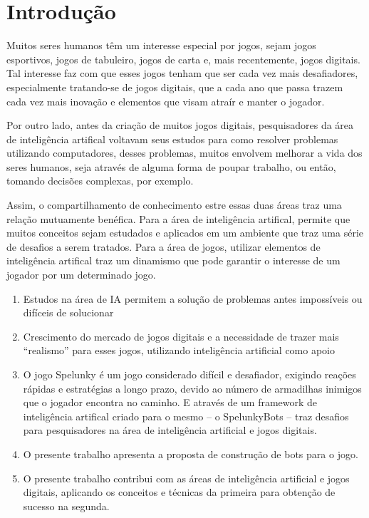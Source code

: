 \chapter{\label{chap:intro}Introdução}

Muitos seres humanos têm um interesse especial por jogos, sejam jogos
esportivos, jogos de tabuleiro, jogos de carta e, mais recentemente, jogos
digitais. Tal interesse faz com que esses jogos tenham que ser cada vez mais
desafiadores, especialmente tratando-se de jogos digitais, que a cada ano que
passa trazem cada vez mais inovação e elementos que visam atraír e manter o
jogador.

Por outro lado, antes da criação de muitos jogos digitais, pesquisadores da área
de inteligência artifical voltavam seus estudos para como resolver problemas
utilizando computadores, desses problemas, muitos envolvem melhorar a vida dos
seres humanos, seja através de alguma forma de poupar trabalho, ou então,
tomando decisões complexas, por exemplo.

Assim, o compartilhamento de conhecimento estre essas duas áreas traz uma
relação mutuamente benéfica. Para a área de inteligência artifical, permite que
muitos conceitos sejam estudados e aplicados em um ambiente que traz uma série
de desafios a serem tratados. Para a área de jogos, utilizar elementos de
inteligência artifical traz um dinamismo que pode garantir o interesse de um
jogador por um determinado jogo.

\begin{enumerate}
    \item Estudos na área de IA permitem a solução de problemas antes
        impossíveis ou difíceis de solucionar
    \item Crescimento do mercado de jogos digitais e a necessidade de trazer
        mais ``realismo'' para esses jogos, utilizando inteligência artificial
        como apoio
    \item O jogo Spelunky é um jogo considerado difícil e desafiador, exigindo
        reações rápidas e estratégias a longo prazo, devido ao número de
        armadilhas inimigos que o jogador encontra no caminho. E através de um 
        framework de inteligência artifical criado para o mesmo -- o
        SpelunkyBots -- traz desafios para pesquisadores na área de inteligência
        artificial e jogos digitais.
    \item O presente trabalho apresenta a proposta de construção de bots para o
        jogo.
    \item O presente trabalho contribui com as áreas de inteligência artificial
        e jogos digitais, aplicando os conceitos e técnicas da primeira para
        obtenção de sucesso na segunda.
\end{enumerate}
